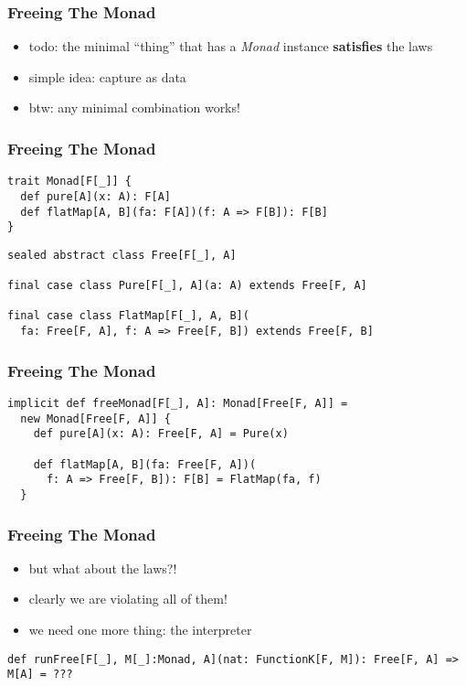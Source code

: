 \documentclass{beamer}
\begin{document}
\begin{frame}[fragile]
  \frametitle{Freeing The Monad}
  \begin{itemize}
  \item todo: the minimal ``thing'' that has a \textit{Monad} instance
    \textbf{satisfies} the laws
  \item simple idea: capture as data
  \item btw: any minimal combination works!
  \end{itemize}
\end{frame}

\begin{frame}[fragile]
  \frametitle{Freeing The Monad}
    \begin{center}
\begin{verbatim}
trait Monad[F[_]] {
  def pure[A](x: A): F[A]
  def flatMap[A, B](fa: F[A])(f: A => F[B]): F[B]
}
\end{verbatim}
\vspace{1cm}
\begin{verbatim}
sealed abstract class Free[F[_], A]

final case class Pure[F[_], A](a: A) extends Free[F, A]

final case class FlatMap[F[_], A, B](
  fa: Free[F, A], f: A => Free[F, B]) extends Free[F, B]
  \end{verbatim}
\end{center}
\end{frame}

\begin{frame}[fragile]
  \frametitle{Freeing The Monad}
    \begin{center}
\begin{verbatim}
implicit def freeMonad[F[_], A]: Monad[Free[F, A]] =
  new Monad[Free[F, A]] {
    def pure[A](x: A): Free[F, A] = Pure(x)

    def flatMap[A, B](fa: Free[F, A])(
      f: A => Free[F, B]): F[B] = FlatMap(fa, f)
  }
\end{verbatim}
\end{center}
\end{frame}

\begin{frame}[fragile]
  \frametitle{Freeing The Monad}
  \begin{itemize}
  \item but what about the laws?!
  \item clearly we are violating all of them!
  \item we need one more thing: the interpreter
  \end{itemize}
  \begin{verbatim}
def runFree[F[_], M[_]:Monad, A](nat: FunctionK[F, M]): Free[F, A] => M[A] = ???
  \end{verbatim}
\end{frame}
\end{document}

